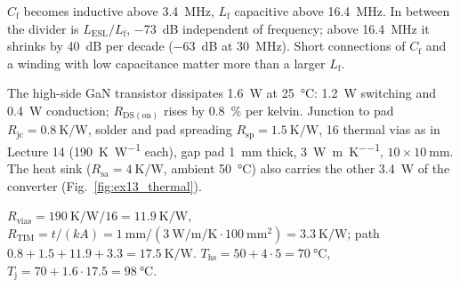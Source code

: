 
\begin{solutionblock}
	$C_\mathrm{f}$ becomes inductive above \SI{3.4}{\mega\hertz}, $L_\mathrm{f}$ capacitive above \SI{16.4}{\mega\hertz}. In between the divider is $L_\mathrm{ESL}/L_\mathrm{f}$, \SI{-73}{dB} independent of frequency; above \SI{16.4}{\mega\hertz} it shrinks by \SI{40}{dB} per decade (\SI{-63}{dB} at \SI{30}{\mega\hertz}). Short connections of $C_\mathrm{f}$ and a winding with low capacitance matter more than a larger $L_\mathrm{f}$.
\end{solutionblock}



The high-side GaN transistor dissipates \SI{1.6}{\watt} at \SI{25}{\celsius}: \SI{1.2}{\watt} switching and \SI{0.4}{\watt} conduction; $R_\mathrm{DS(on)}$ rises by \SI{0.8}{\percent} per kelvin. Junction to pad $R_\mathrm{jc}=\SI{0.8}{\kelvin\per\watt}$, solder and pad spreading $R_\mathrm{sp}=\SI{1.5}{\kelvin\per\watt}$, 16 thermal vias as in Lecture 14 (\SI{190}{\kelvin\per\watt} each), gap pad \SI{1}{\milli\metre} thick, \SI{3}{\watt\per\metre\per\kelvin}, $10\times\SI{10}{\milli\metre}$. The heat sink ($R_\mathrm{sa}=\SI{4}{\kelvin\per\watt}$, ambient \SI{50}{\celsius}) also carries the other \SI{3.4}{\watt} of the converter (Fig.~\ref{fig:ex13_thermal}).




\begin{solutionblock}
	$R_\mathrm{vias}=\SI{190}{\kelvin\per\watt}/16=\SI{11.9}{\kelvin\per\watt}$, $R_\mathrm{TIM}=t/(kA)=\SI{1}{\milli\metre}/(\SI{3}{\watt\per\metre\per\kelvin}\cdot\SI{100}{\milli\metre\squared})=\SI{3.3}{\kelvin\per\watt}$; path $0.8+1.5+11.9+3.3=\SI{17.5}{\kelvin\per\watt}$. $T_\mathrm{hs}=50+4\cdot5=\SI{70}{\celsius}$, $T_\mathrm{j}=70+1.6\cdot17.5=\SI{98}{\celsius}$.
\end{solutionblock}


